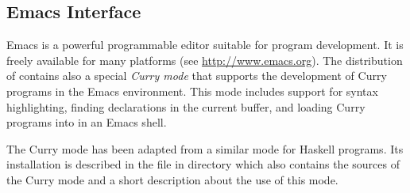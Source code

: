\subsection{Emacs Interface}

Emacs is a powerful programmable editor suitable for program development.
It is freely available for many platforms
(see \url{http://www.emacs.org}).
The distribution of \CYS contains also a special
\emph{Curry mode}
that supports the development of Curry programs in
the Emacs environment.
This mode includes support for syntax highlighting,
finding declarations in the current buffer, and
loading Curry programs into \CYS
in an Emacs shell.

The Curry mode has been adapted from a similar mode for Haskell programs.
Its installation is described in the file 
in directory  which also contains
the sources of the Curry mode and a short description about
the use of this mode.

